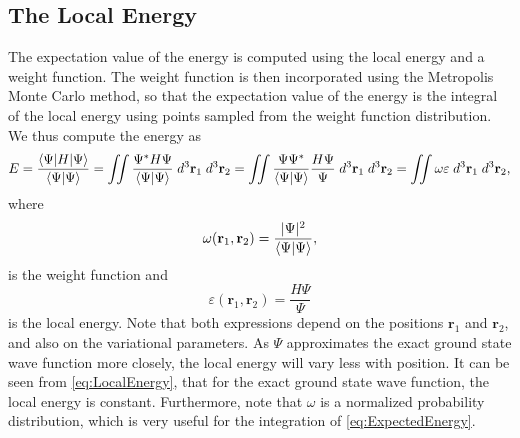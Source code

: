 \documentclass[twoside]{article}
\newcommand{\bfr}{\ensuremath{\mathbf{r}}}
\begin{document}
\subsection{The Local Energy}\label{sec:localEnergy}
The expectation value of the energy is computed using the local energy and a weight function. The weight function is then incorporated using the Metropolis Monte Carlo method, so that the expectation value of the energy is the integral of the local energy using points sampled from the weight function distribution. We thus compute the energy as
\begin{equation}
E = \frac{\braket{\Psi|H|\Psi}}{\braket{\Psi|\Psi}} = 
\iint \frac{\Psi^* H \Psi}{\braket{\Psi|\Psi}}  \; d^3\bfr_1 \; d^3\bfr_2 = 
\iint \frac{\Psi\Psi^*}{\braket{\Psi|\Psi}} \frac{H \Psi}{\Psi} \; d^3\bfr_1 \; d^3\bfr_2 = \iint \omega \varepsilon \; d^3\bfr_1 \; d^3\bfr_2,
\label{eq:ExpectedEnergy}
\end{equation} 
where
\begin{equation}
\omega(\bfr_1,\bfr_2) = \frac{|\Psi|^2}{\braket{\Psi|\Psi}},
\end{equation}
is the weight function and
\begin{equation}
\varepsilon(\bfr_1,\bfr_2) = \frac{H \Psi}{\Psi}
\label{eq:LocalEnergy}
\end{equation}
is the local energy. Note that both expressions depend on the positions $\bfr_1$ and $\bfr_2$, and also on the variational parameters. As $\Psi$ approximates the exact ground state wave function more closely, the local energy will vary less with position. It can be seen from \eqref{eq:LocalEnergy}, that for the exact ground state wave function, the local energy is constant. Furthermore, note that $\omega$ is a normalized probability distribution, which is very useful for the integration of \eqref{eq:ExpectedEnergy}.
\end{document}
